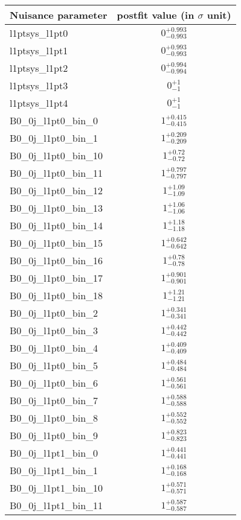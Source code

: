 
\begin{tabular}{|l|c|}
\hline
Nuisance parameter & postfit value (in $\sigma$ unit) \\\hline
l1ptsys\_l1pt0 & $0^{+0.993}_{-0.993}$ \\
l1ptsys\_l1pt1 & $0^{+0.993}_{-0.993}$ \\
l1ptsys\_l1pt2 & $0^{+0.994}_{-0.994}$ \\
l1ptsys\_l1pt3 & $0^{+1}_{-1}$ \\
l1ptsys\_l1pt4 & $0^{+1}_{-1}$ \\
B0\_0j\_l1pt0\_bin\_0 & $1^{+0.415}_{-0.415}$ \\
B0\_0j\_l1pt0\_bin\_1 & $1^{+0.209}_{-0.209}$ \\
B0\_0j\_l1pt0\_bin\_10 & $1^{+0.72}_{-0.72}$ \\
B0\_0j\_l1pt0\_bin\_11 & $1^{+0.797}_{-0.797}$ \\
B0\_0j\_l1pt0\_bin\_12 & $1^{+1.09}_{-1.09}$ \\
B0\_0j\_l1pt0\_bin\_13 & $1^{+1.06}_{-1.06}$ \\
B0\_0j\_l1pt0\_bin\_14 & $1^{+1.18}_{-1.18}$ \\
B0\_0j\_l1pt0\_bin\_15 & $1^{+0.642}_{-0.642}$ \\
B0\_0j\_l1pt0\_bin\_16 & $1^{+0.78}_{-0.78}$ \\
B0\_0j\_l1pt0\_bin\_17 & $1^{+0.901}_{-0.901}$ \\
B0\_0j\_l1pt0\_bin\_18 & $1^{+1.21}_{-1.21}$ \\
B0\_0j\_l1pt0\_bin\_2 & $1^{+0.341}_{-0.341}$ \\
B0\_0j\_l1pt0\_bin\_3 & $1^{+0.442}_{-0.442}$ \\
B0\_0j\_l1pt0\_bin\_4 & $1^{+0.409}_{-0.409}$ \\
B0\_0j\_l1pt0\_bin\_5 & $1^{+0.484}_{-0.484}$ \\
B0\_0j\_l1pt0\_bin\_6 & $1^{+0.561}_{-0.561}$ \\
B0\_0j\_l1pt0\_bin\_7 & $1^{+0.588}_{-0.588}$ \\
B0\_0j\_l1pt0\_bin\_8 & $1^{+0.552}_{-0.552}$ \\
B0\_0j\_l1pt0\_bin\_9 & $1^{+0.823}_{-0.823}$ \\
B0\_0j\_l1pt1\_bin\_0 & $1^{+0.441}_{-0.441}$ \\
B0\_0j\_l1pt1\_bin\_1 & $1^{+0.168}_{-0.168}$ \\
B0\_0j\_l1pt1\_bin\_10 & $1^{+0.571}_{-0.571}$ \\
B0\_0j\_l1pt1\_bin\_11 & $1^{+0.587}_{-0.587}$ \\

\end{tabular}
